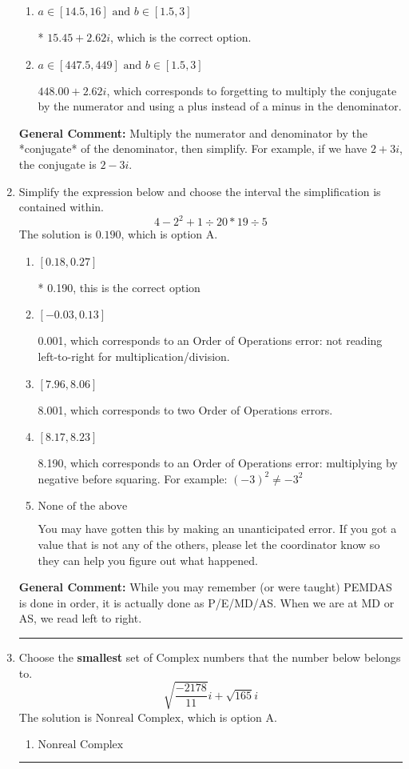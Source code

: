 \documentclass{extbook}[14pt]
\newcommand{\litem}[1]{\item #1

\rule{\textwidth}{0.4pt}}
\begin{document}
\begin{enumerate}
{\begin{enumerate}[label=\Alph*.]
 $14.40  + 22.00 i$, which corresponds to just dividing the first term by the first term and the second by the second.
\item \( a \in [14.5, 16] \text{ and } b \in [1.5, 3] \)

* $15.45  + 2.62 i$, which is the correct option.
\item \( a \in [447.5, 449] \text{ and } b \in [1.5, 3] \)

 $448.00  + 2.62 i$, which corresponds to forgetting to multiply the conjugate by the numerator and using a plus instead of a minus in the denominator.
\end{enumerate}

\textbf{General Comment:} Multiply the numerator and denominator by the *conjugate* of the denominator, then simplify. For example, if we have $2+3i$, the conjugate is $2-3i$.
}
\litem{
Simplify the expression below and choose the interval the simplification is contained within.
\[ 4 - 2^2 + 1 \div 20 * 19 \div 5 \]The solution is \( 0.190 \), which is option A.\begin{enumerate}[label=\Alph*.]
\item \( [0.18, 0.27] \)

* 0.190, this is the correct option
\item \( [-0.03, 0.13] \)

 0.001, which corresponds to an Order of Operations error: not reading left-to-right for multiplication/division.
\item \( [7.96, 8.06] \)

 8.001, which corresponds to two Order of Operations errors.
\item \( [8.17, 8.23] \)

 8.190, which corresponds to an Order of Operations error: multiplying by negative before squaring. For example: $(-3)^2 \neq -3^2$
\item \( \text{None of the above} \)

 You may have gotten this by making an unanticipated error. If you got a value that is not any of the others, please let the coordinator know so they can help you figure out what happened.
\end{enumerate}

\textbf{General Comment:} While you may remember (or were taught) PEMDAS is done in order, it is actually done as P/E/MD/AS. When we are at MD or AS, we read left to right.
}
\litem{
Choose the \textbf{smallest} set of Complex numbers that the number below belongs to.
\[ \sqrt{\frac{-2178}{11}} i+\sqrt{165}i \]The solution is \( \text{Nonreal Complex} \), which is option A.\begin{enumerate}[label=\Alph*.]
\item \( \text{Nonreal Complex} \)


\end{enumerate}}
\end{enumerate}
\end{document}
